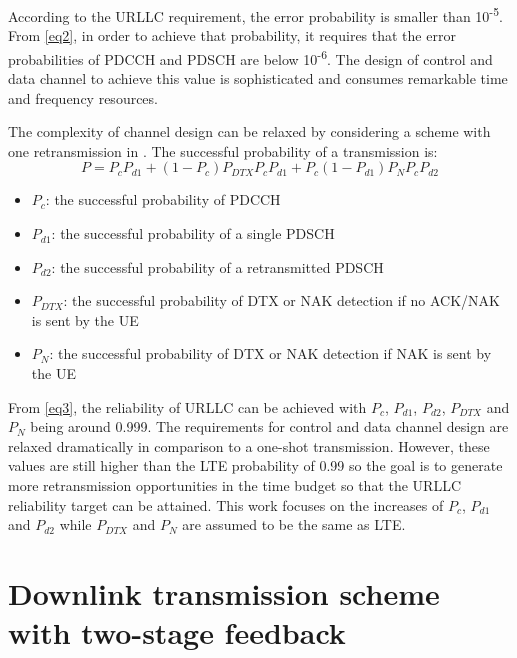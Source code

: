 \documentclass[conference]{IEEEtran}
\begin{document}
According to the URLLC requirement, the error probability is smaller than 10\textsuperscript{-5}. From \eqref{eq2}, in order to achieve that probability, it requires that the error probabilities of PDCCH and PDSCH are below 10\textsuperscript{-6}. The design of control and data channel to achieve this value is sophisticated and consumes remarkable time and frequency resources.

The complexity of channel design can be relaxed by considering a scheme with one retransmission in \cite{b7}. The successful probability of a transmission is:
\begin{equation}
P = P_{c}P_{d1} + (1-P_{c})P_{DTX}P_{c}P_{d1} + P_{c}(1-P_{d1})P_{N}P_{c}P_{d2}\label{eq3}
\end{equation}
\begin{itemize}
    \item $P_{c}$: the successful probability of PDCCH
    \item $P_{d1}$: the successful probability of a single PDSCH
    \item $P_{d2}$: the successful probability of a retransmitted PDSCH
    \item $P_{DTX}$: the successful probability of DTX or NAK detection if no ACK/NAK is sent by the UE
    \item $P_{N}$: the successful probability of DTX or NAK detection if NAK is sent by the UE
\end{itemize}

From \eqref{eq3}, the reliability of URLLC can be achieved with $P_{c}$, $P_{d1}$, $P_{d2}$, $P_{DTX}$ and $P_{N}$ being around 0.999. The requirements for control and data channel design are relaxed dramatically in comparison to a one-shot transmission. However, these values are still higher than the LTE probability of 0.99 so the goal is to generate more retransmission opportunities in the time budget  so  that  the  URLLC  reliability  target  can be attained. This work focuses on the increases of $P_{c}$, $P_{d1}$ and $P_{d2}$ while $P_{DTX}$ and $P_{N}$ are assumed to be the same as LTE.

\section{Downlink transmission scheme with two-stage feedback}
\end{document}
